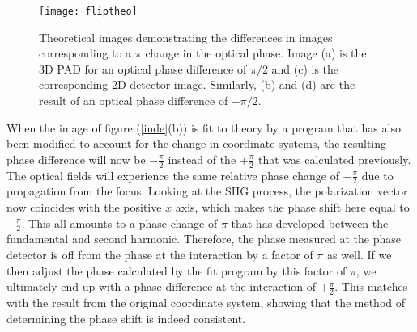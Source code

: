 \begin{figure}
\texttt{[image: fliptheo]}
\caption[Effect of $\pi$ shift in optical phase on detector
images]{Theoretical images demonstrating the differences in images
corresponding to a $\pi$ change in the optical phase.  Image (a)
is the 3D PAD for an optical phase difference of $\pi/2$ and (c)
is the corresponding 2D detector image.  Similarly, (b) and (d)
are the result of an optical phase difference of $-\pi/2$.}
\label{fliptheo}%
\end{figure}

When the image of figure (\ref{inde}(b)) is fit to theory by a
program that has also been modified to account for the change in
coordinate systems, the resulting phase difference will now be
$-\frac{\pi}{2}$ instead of the $+\frac{\pi}{2}$ that was
calculated previously.  The optical fields will experience the
same relative phase change of $-\frac{\pi}{2}$ due to propagation
from the focus.  Looking at the SHG process, the polarization
vector now coincides with the positive $x$ axis, which makes the
phase shift here equal to $-\frac{\pi}{2}$.  This all amounts to a
phase change of $\pi$ that has developed between the fundamental
and second harmonic.  Therefore, the phase measured at the phase
detector is off from the phase at the interaction by a factor of
$\pi$ as well.  If we then adjust the phase calculated by the fit
program by this factor of $\pi$, we ultimately end up with a phase
difference at the interaction of $+\frac{\pi}{2}$.  This matches
with the result from the original coordinate system, showing that
the method of determining the phase shift is indeed consistent.
